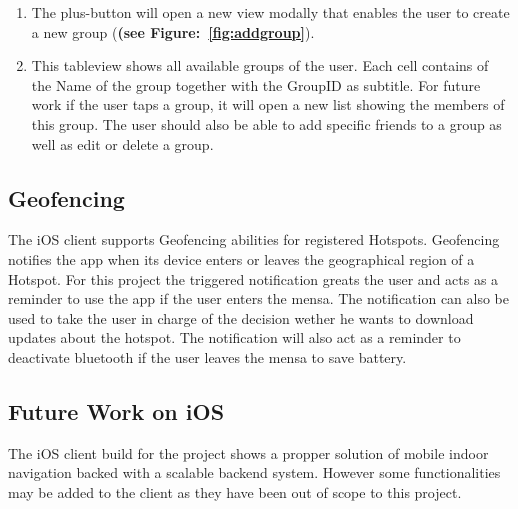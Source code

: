 \begin{enumerate}
 \item The plus-button will open a new view modally that enables the user to create a new group (\textbf{(see Figure:~\ref{fig:addgroup}}).
 \item This tableview shows all available groups of the user. Each cell contains of the Name of the group together with the GroupID as subtitle. For future work if the user taps a group, it will open a new list showing the members of this group. The user should also be able to add specific friends to a group as well as edit or delete a group.
\end{enumerate}

\subsection{Geofencing}
The iOS client supports Geofencing abilities for registered Hotspots. Geofencing notifies the app when its device enters or leaves the geographical region of a Hotspot. For this project the triggered notification greats the user and acts as a reminder to use the app if the user enters the mensa. The notification can also be used to take the user in charge of the decision wether he wants to download updates about the hotspot. The notification will also act as a reminder to deactivate bluetooth if the user leaves the mensa to save battery.


\subsection{Future Work on iOS}
The iOS client build for the project shows a propper solution of mobile indoor navigation backed with a scalable backend system. However some functionalities may be added to the client as they have been out of scope to this project.

